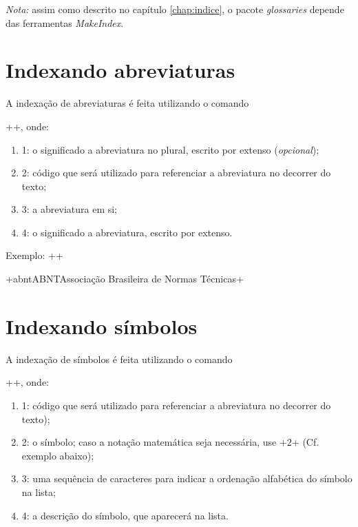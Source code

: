 \documentclass[xindy,draft]{fei}
\begin{document}
	\emph{Nota:} assim como descrito no capítulo \ref{chap:indice}, o pacote \emph{glossaries} depende das ferramentas \emph{MakeIndex}.
	
	\section{Indexando abreviaturas}
	
	A indexação de abreviaturas é feita utilizando o comando
	
	\latexinline++, onde:
	
	\begin{enumerate}
	\item 1: o significado a abreviatura no plural, escrito por extenso (\emph{opcional});
	\item 2: código que será utilizado para referenciar a abreviatura no decorrer do texto;
	\item 3: a abreviatura em si;
	\item 4: o significado a abreviatura, escrito por extenso.
	\end{enumerate}
	
	Exemplo: \latexinline+\newacronym[longplural=Associações+
	
			 \latexinline+Brasileiras de Normas Técnicas]+
			 
			 \latexinline+{abnt}{ABNT}{Associação Brasileira de Normas Técnicas}+
			 
	\section{Indexando símbolos}
	
	A indexação de símbolos é feita utilizando o comando
	
	\latexinline++, onde:
	
	\begin{enumerate}
	\item 1: código que será utilizado para referenciar a abreviatura no decorrer do texto);
	\item 2: o símbolo; caso a notação matemática seja necessária, use \latexinline+\ensuremath{2}+ (Cf. exemplo abaixo);
	\item 3: uma sequência de caracteres para indicar a ordenação alfabética do símbolo na lista;
	\item 4: a descrição do símbolo, que aparecerá na lista.
	\end{enumerate}
	
\end{document}

